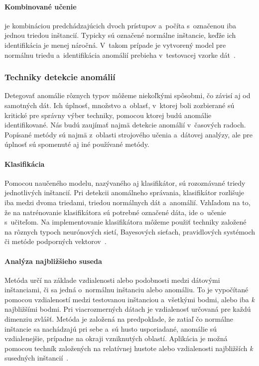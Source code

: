 \documentclass[a4paper,twoside,slovak,12pt,appendix]{article}
\begin{document}
\paragraph{Kombinované učenie} je kombináciou predchádzajúcich dvoch prístupov
a~počíta s~označenou iba jednou triedou inštancií. Typicky sú označené normálne
inštancie, keďže ich identifikácia je menej náročná. V~takom prípade je
vytvorený model pre normálnu triedu a~identifikácia anomálií prebieha
v~testovacej vzorke dát~\cite{Chandola2009}.


\subsubsection{Techniky detekcie anomálií}
\label{c-analysis-techniques}
Detegovať anomálie rôznych typov môžeme niekoľkými spôsobmi, čo závisí aj od
samotných dát. Ich úplnosť, množstvo a~oblasť, v~ktorej boli zozbierané sú
kritické pre správny výber techniky, pomocou ktorej budú anomálie
identifikované. Nás budú zaujímať najmä detekcie anomálií v~časových radoch.
Popísané metódy sú najmä z~oblasti strojového učenia a~dátovej analýzy, ale pre
úplnosť sú spomenuté aj iné používané metódy.

\paragraph{Klasifikácia}
Pomocou naučeného modelu, nazývaného aj klasifikátor, sú rozoznávané triedy
jednotlivých inštancií. Pri detekcii anomálneho správania, klasifikátor
rozlišuje iba medzi dvoma triedami, triedou normálnych dát a~anomálií. Vzhľadom
na to, že na natrénovanie klasifikátora sú potrebné označené dáta, ide o~učenie
s~učiteľom. Na implementovanie klasifikátora môžeme použiť techniky založené na
rôznych typoch neurónových sietí, Bayesových sieťach, pravidlových systémoch či
metóde podporných vektorov~\cite{Chandola2009,Tan2005}.

\paragraph{Analýza najbližšieho suseda}
Metóda určí na základe vzdialenosti alebo podobnosti medzi dátovými inštanciami,
či sa jedná o~normálnu inštanciu alebo anomáliu. To je vypočítané pomocou
vzdialeností medzi testovanou inštanciou a~všetkými bodmi, alebo iba \textit{k}
najbližšími bodmi. Pri viacrozmerných dátach je vzdialenosť určovaná pre
každú dimenziu zvlášť. Metóda je založená na predpoklade, že zatiaľ čo normálne
inštancie sa nachádzajú pri sebe a~sú husto usporiadané, anomálie sú
vzdialenejšie, prípadne na okraji vzniknutých oblastí. Aplikácia je možná
pomocou techník založených na relatívnej hustote alebo vzdialenosti najbližších
\textit{k} susedných inštancií~\cite{Chandola2009,Tan2005}.
\end{document}
